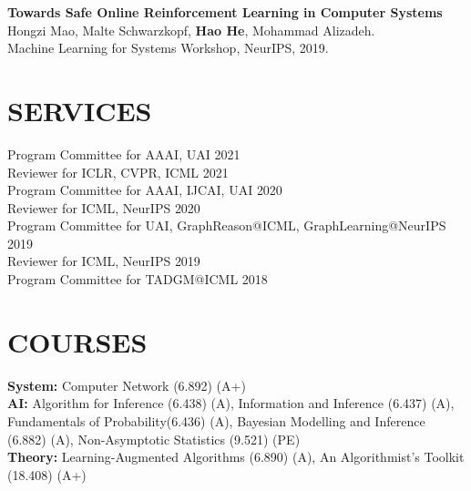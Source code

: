 \documentclass[margin]{res}
\begin{document}
\begin{resume}
\textbf{Towards Safe Online Reinforcement Learning in Computer Systems}\\
Hongzi Mao, Malte Schwarzkopf, \textbf{Hao He}, Mohammad Alizadeh.\\
Machine Learning for Systems Workshop, NeurIPS, 2019.



\section{SERVICES}
Program Committee for AAAI, UAI \hfill{2021}\\
Reviewer for ICLR, CVPR, ICML \hfill{2021}\\
Program Committee for AAAI, IJCAI, UAI \hfill{2020}\\
Reviewer for ICML, NeurIPS \hfill{2020}\\
Program Committee for UAI, GraphReason@ICML, GraphLearning@NeurIPS \hfill{2019}\\
Reviewer for ICML, NeurIPS \hfill{2019}\\
Program Committee for TADGM@ICML \hfill{2018}\\


\section{COURSES}
\textbf{System:} Computer Network (6.892) (A+) \\
\textbf{AI:} Algorithm for Inference (6.438) (A), Information and Inference (6.437) (A), Fundamentals of Probability(6.436) (A), Bayesian Modelling and Inference (6.882) (A), Non-Asymptotic Statistics (9.521) (PE) \\
\textbf{Theory:} Learning-Augmented Algorithms (6.890) (A), An Algorithmist's Toolkit (18.408) (A+)\\


\end{resume}
\end{document}
